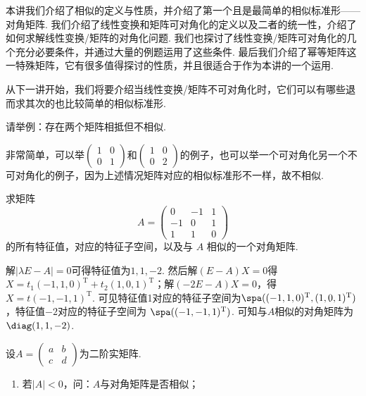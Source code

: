 \begin{summary}

    本讲我们介绍了相似的定义与性质，并介绍了第一个且是最简单的相似标准形——对角矩阵. 我们介绍了线性变换和矩阵可对角化的定义以及二者的统一性，介绍了如何求解线性变换/矩阵的对角化问题. 我们也探讨了线性变换/矩阵可对角化的几个充分必要条件，并通过大量的例题运用了这些条件. 最后我们介绍了幂等矩阵这一特殊矩阵，它有很多值得探讨的性质，并且很适合于作为本讲的一个运用.

    从下一讲开始，我们将要介绍当线性变换/矩阵不可对角化时，它们可以有哪些退而求其次的也比较简单的相似标准形.

\end{summary}

\begin{exercise}

    \begin{exgroup}
        \item 请举例：存在两个矩阵相抵但不相似.
        \begin{answer}
            非常简单，可以举$\begin{pmatrix}
                1 & 0 \\ 0 & 1
            \end{pmatrix}$和$\begin{pmatrix}
                1 & 0 \\ 0 & 2
            \end{pmatrix}$的例子，也可以举一个可对角化另一个不可对角化的例子，因为上述情况矩阵对应的相似标准形不一样，故不相似.
        \end{answer}
        \item 求矩阵
        \[A = \begin{pmatrix}
                0  & -1 & 1 \\
                -1 & 0  & 1 \\
                1  & 1  & 0
            \end{pmatrix}\]
        的所有特征值，对应的特征子空间，以及与 $A$ 相似的一个对角矩阵.
        \begin{answer}
            解$|\lambda E-A|=0$可得特征值为$1,1,-2$. 然后解$(E-A)X=0$得$X=t_1(-1,1,0)^\mathrm{T}+t_2(1,0,1)^\mathrm{T}$；解$(-2E-A)X=0$，得$X=t(-1,-1,1)^\mathrm{T}$. 可见特征值1对应的特征子空间为$\spa((-1,1,0)^\mathrm{T},(1,0,1)^\mathrm{T})$，特征值$-2$对应的特征子空间为 $\spa((-1,-1,1)^\mathrm{T})$. 可知与$A$相似的对角矩阵为 $\diag(1,1,-2)$.
        \end{answer}
        \item 设$A=\begin{pmatrix}
                a & b \\ c & d
            \end{pmatrix}$为二阶实矩阵.
        \begin{enumerate}
            \item 若$|A|<0$，问：$A$与对角矩阵是否相似；


\end{enumerate}
\end{exgroup}
\end{exercise}
